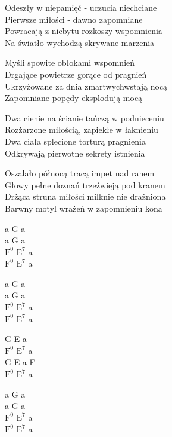 \begin{text}
    Odeszły w niepamięć - uczucia niechciane\\
    Pierwsze miłości - dawno zapomniane\\
    Powracają z niebytu rozkoszy wspomnienia\\
    Na światło wychodzą skrywane marzenia

    Myśli spowite obłokami wspomnień\\
    Drgające powietrze gorące od pragnień\\
    Ukrzyżowane za dnia zmartwychwstają nocą\\
    Zapomniane popędy eksplodują mocą

    \vin Dwa cienie na ścianie tańczą w podnieceniu\\
    \vin Rozżarzone miłością, zapiekłe w łaknieniu\\
    \vin Dwa ciała splecione torturą pragnienia\\
    \vin Odkrywają pierwotne sekrety istnienia

    Oszalało północą tracą impet nad ranem\\
    Głowy pełne doznań trzeźwieją pod kranem\\
    Drżąca struna miłości milknie nie drażniona\\
    Barwny motyl wrażeń w zapomnieniu kona
\end{text}
\begin{chord}
    a G a\\
    a G a\\
    $\mathrm{F^{0}}$ $\mathrm{E^{7}}$ a\\
    $\mathrm{F^{0}}$ $\mathrm{E^{7}}$ a

    a G a\\
    a G a\\
    $\mathrm{F^{0}}$ $\mathrm{E^{7}}$ a\\
    $\mathrm{F^{0}}$ $\mathrm{E^{7}}$ a

    G E a\\
    $\mathrm{F^{0}}$ $\mathrm{E^{7}}$ a\\
    G E a F\\
    $\mathrm{F^{0}}$ $\mathrm{E^{7}}$ a

    a G a\\
    a G a\\
    $\mathrm{F^{0}}$ $\mathrm{E^{7}}$ a\\
    $\mathrm{F^{0}}$ $\mathrm{E^{7}}$ a

\end{chord}
